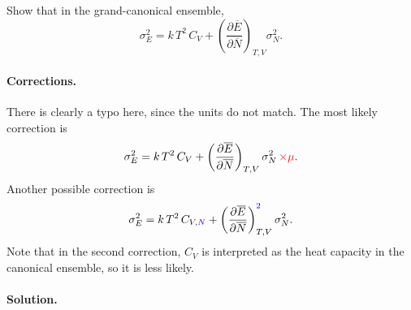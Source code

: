 \documentclass[reprint]{revtex4-1}
\numberwithin{equation}{section}
\begin{document}
Show that in the grand-canonical ensemble,
$$
\sigma_E^2 = k \, T^2 \, C_V
  + \left( \frac{\partial \overline E } { \partial \overline N} \right)_{T, V} \sigma_N^2.
$$

\paragraph*{Corrections.}

There is clearly a typo here, since the units do not match.
%
The most likely correction is
\begin{equation}
  \sigma_E^2 = k \, T^2 \, C_V
  + \left( \frac{\partial \overline E } { \partial \overline N} \right)_{T, V} \sigma_N^2 \, \textcolor{red}{\times \mu}.
  \label{eq:prob3-22a}
\end{equation}
%
Another possible correction is
%
\begin{equation}
  \sigma_E^2 = k \, T^2 \, C_{V,\textcolor{blue}{N}}
  + \left( \frac{\partial \overline E } { \partial \overline N} \right)_{T, V}^{\textcolor{blue}{2}} \sigma_N^2.
  \label{eq:prob3-22b}
\end{equation}
%
Note that in the second correction,
$C_V$ is interpreted as the heat capacity in the canonical ensemble,
so it is less likely.

\paragraph*{Solution.}
\end{document}
